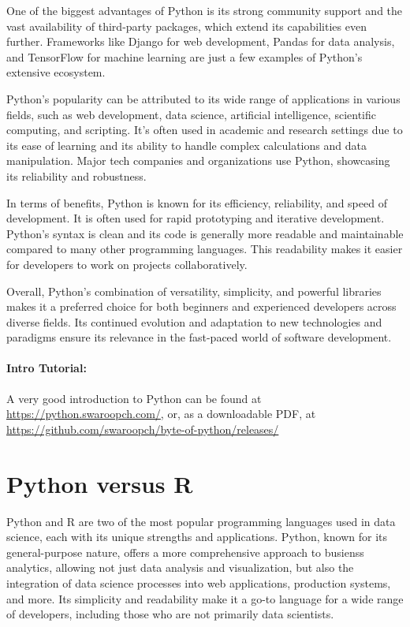 One of the biggest advantages of Python is its strong community support and the vast availability of third-party packages, which extend its capabilities even further. Frameworks like Django for web development, Pandas for data analysis, and TensorFlow for machine learning are just a few examples of Python's extensive ecosystem.

Python's popularity can be attributed to its wide range of applications in various fields, such as web development, data science, artificial intelligence, scientific computing, and scripting. It's often used in academic and research settings due to its ease of learning and its ability to handle complex calculations and data manipulation. Major tech companies and organizations use Python, showcasing its reliability and robustness.

In terms of benefits, Python is known for its efficiency, reliability, and speed of development. It is often used for rapid prototyping and iterative development. Python's syntax is clean and its code is generally more readable and maintainable compared to many other programming languages. This readability makes it easier for developers to work on projects collaboratively.

Overall, Python's combination of versatility, simplicity, and powerful libraries makes it a preferred choice for both beginners and experienced developers across diverse fields. Its continued evolution and adaptation to new technologies and paradigms ensure its relevance in the fast-paced world of software development.

\begin{tcolorbox}[colback=code]
\paragraph*{Intro Tutorial:} 

A very good introduction to Python can be found at \url{https://python.swaroopch.com/}, or, as a downloadable PDF, at \url{https://github.com/swaroopch/byte-of-python/releases/}
\end{tcolorbox}

\section{Python versus R}

Python and R are two of the most popular programming languages used in data science, each with its unique strengths and applications. Python, known for its general-purpose nature, offers a more comprehensive approach to busienss analytics, allowing not just data analysis and visualization, but also the integration of data science processes into web applications, production systems, and more. Its simplicity and readability make it a go-to language for a wide range of developers, including those who are not primarily data scientists.

